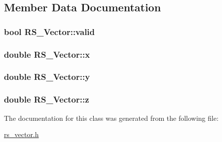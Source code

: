 \subsection{Member Data Documentation}
\hypertarget{class_r_s___vector_a218a279eef9451516eb2f35473471f06}{
\subsubsection[{valid}]{\setlength{\rightskip}{0pt plus 5cm}bool R\-S\-\_\-\-Vector\-::valid}}\label{class_r_s___vector_a218a279eef9451516eb2f35473471f06}
\hypertarget{class_r_s___vector_a81383ed1e6f744095698592fb7a4da87}{
\subsubsection[{x}]{\setlength{\rightskip}{0pt plus 5cm}double R\-S\-\_\-\-Vector\-::x}}\label{class_r_s___vector_a81383ed1e6f744095698592fb7a4da87}
\hypertarget{class_r_s___vector_afb6a5512921abeaa92b9b7a1161a7657}{
\subsubsection[{y}]{\setlength{\rightskip}{0pt plus 5cm}double R\-S\-\_\-\-Vector\-::y}}\label{class_r_s___vector_afb6a5512921abeaa92b9b7a1161a7657}
\hypertarget{class_r_s___vector_ac82be7d44c6e2848b6391fe22657ee74}{
\subsubsection[{z}]{\setlength{\rightskip}{0pt plus 5cm}double R\-S\-\_\-\-Vector\-::z}}\label{class_r_s___vector_ac82be7d44c6e2848b6391fe22657ee74}


The documentation for this class was generated from the following file\-:\begin{DoxyCompactItemize}
\item 
\hyperlink{rs__vector_8h}{rs\-\_\-vector.\-h}\end{DoxyCompactItemize}
